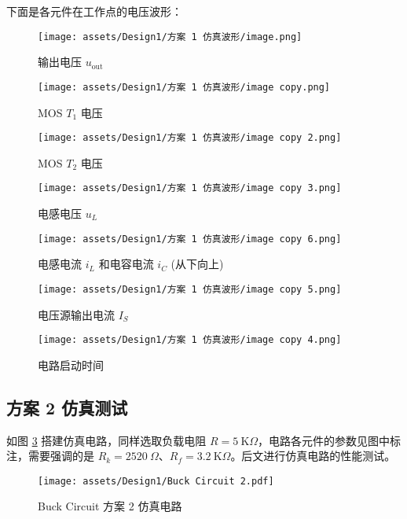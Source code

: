 \documentclass[UTF8]{article}
\def\kO{\ \mathrm{K}\Omega}
\def\KO{\ \mathrm{K}\Omega}
\def\kO{\ \mathrm{K}\Omega}
\def\KO{\ \mathrm{K}\Omega}
\theoremstyle{MyLineTheoremStyle} %
\theoremstyle{MyBlockTheoremStyle} %
\theoremstyle{MySubsubsectionStyle} %
\begin{document}
下面是各元件在工作点的电压波形：
\begin{figure}[H]\centering
    \texttt{[image: assets/Design1/方案 1 仿真波形/image.png]}
    \caption{输出电压 $u_{\text{out}}$}
    \label{输出电压 1}
\end{figure}
\begin{figure}[H]\centering
    \texttt{[image: assets/Design1/方案 1 仿真波形/image copy.png]}
    \caption{MOS $T_1$ 电压}
\end{figure}
\begin{figure}[H]\centering
    \texttt{[image: assets/Design1/方案 1 仿真波形/image copy 2.png]}
    \caption{MOS $T_2$ 电压}
\end{figure}
\begin{figure}[H]\centering
    \texttt{[image: assets/Design1/方案 1 仿真波形/image copy 3.png]}
    \caption{电感电压 $u_L$}
\end{figure}
\begin{figure}[H]\centering
    \texttt{[image: assets/Design1/方案 1 仿真波形/image copy 6.png]}
    \caption{电感电流 $i_L$ 和电容电流 $i_C$ (从下向上)}
\end{figure}
\begin{figure}[H]\centering
    \texttt{[image: assets/Design1/方案 1 仿真波形/image copy 5.png]}
    \caption{电压源输出电流 $I_S$}
\end{figure}
\begin{figure}[H]\centering
    \texttt{[image: assets/Design1/方案 1 仿真波形/image copy 4.png]}
    \caption{电路启动时间}
    \label{启动时间 1}
\end{figure}

\subsection{方案 2 仿真测试}

如图 \ref{Buck Circuit 方案 2} 搭建仿真电路，同样选取负载电阻 $R = 5 \kO$，电路各元件的参数见图中标注，需要强调的是 $R_k = 2520\ \Omega$、$R_f =  3.2 \KO$。后文进行仿真电路的性能测试。

\begin{figure}[H]\centering
    \texttt{[image: assets/Design1/Buck Circuit 2.pdf]}
    \caption{Buck Circuit 方案 2 仿真电路}
    \label{Buck Circuit 方案 2}
\end{figure}
\end{document}
